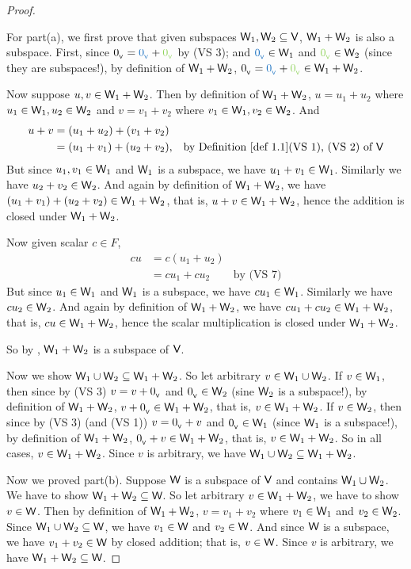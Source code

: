 \begin{proof}\ 

For part(a), we first prove that given subspaces \(\textsf{W}_1, \textsf{W}_2 \subseteq \textsf{V}\), \(\textsf{W}_1 + \textsf{W}_2\) is also a subspace.
First, since \(\OV = \BLUE{\OV} + \GREEN{\OV}\) by (VS 3);
and \(\BLUE{\OV} \in \W_1\) and \(\GREEN{\OV} \in \W_2\) (since they are subspaces!), by definition of \(\textsf{W}_1 + \textsf{W}_2\), \(\OV = \BLUE{\OV} + \GREEN{\OV} \in \W_1 + \W_2\).

Now suppose \(u, v \in \textsf{W}_1 + \textsf{W}_2\).
Then by definition of \(\textsf{W}_1 + \textsf{W}_2\), \(u = u_1 + u_2\) where \(u_1 \in \textsf{W}_1, u_2 \in \textsf{W}_2\) and \(v = v_1 + v_2\) where \(v_1 \in \textsf{W}_1, v_2 \in \textsf{W}_2\).
And
\begin{align*}
    u + v & = (u_1 + u_2) + (v_1 + v_2) \\
          & = (u_1 + v_1) + (u_2 + v_2), & \text{by \DEF{1.1}(VS 1), (VS 2) of \(\V\)}
\end{align*}
But since \(u_1, v_1 \in \textsf{W}_1\) and \(\textsf{W}_1\) is a subspace, we have \(u_1 + v_1 \in \textsf{W}_1\).
Similarly we have \(u_2 + v_2 \in \textsf{W}_2\).
And again by definition of \(\textsf{W}_1 + \textsf{W}_2\), we have \((u_1 + v_1) + (u_2 + v_2) \in \textsf{W}_1 + \textsf{W}_2\), that is, \(u + v \in \textsf{W}_1 + \textsf{W}_2\), hence the addition is closed under \(\textsf{W}_1 + \textsf{W}_2\).

Now given scalar \(c \in F\),
\begin{align*}
    c u & = c(u_1 + u_2) \\
        & = c u_1 + c u_2 & \text{by (VS 7)}
\end{align*}
But since \(u_1 \in \textsf{W}_1\) and \(\textsf{W}_1\) is a subspace, we have \(c u_1 \in \textsf{W}_1\).
Similarly we have \(c u_2 \in \textsf{W}_2\).
And again by definition of \(\textsf{W}_1 + \textsf{W}_2\), we have \(c u_1 + c u_2 \in \textsf{W}_1 + \textsf{W}_2\), that is, \(c u \in \textsf{W}_1 + \textsf{W}_2\), hence the scalar multiplication is closed under \(\textsf{W}_1 + \textsf{W}_2\).

So by , \(\textsf{W}_1 + \textsf{W}_2\) is a subspace of \(\textsf{V}\).

Now we show \(\textsf{W}_1 \cup \textsf{W}_2 \subseteq \textsf{W}_1 + \textsf{W}_2\).
So let arbitrary \(v \in \textsf{W}_1 \cup \textsf{W}_2\).
If \(v \in \textsf{W}_1\), then since by (VS 3) \(v = v + 0_{_{\textsf{V}}}\) and \(0_{_{\textsf{V}}} \in \textsf{W}_2\) (sine \(\textsf{W}_2\) is a subspace!), by definition of \(\textsf{W}_1 + \textsf{W}_2\), \(v + 0_{_{\textsf{V}}} \in \textsf{W}_1 + \textsf{W}_2\), that is, \(v \in \textsf{W}_1 + \textsf{W}_2\).
If \(v \in \textsf{W}_2\), then since by (VS 3) (and (VS 1)) \(v = 0_{_{\textsf{V}}} + v\) and \(0_{_{\textsf{V}}} \in \textsf{W}_1\) (since \(\textsf{W}_1\) is a subspace!), by definition of \(\textsf{W}_1 + \textsf{W}_2\), \(0_{_{\textsf{V}}} + v \in \textsf{W}_1 + \textsf{W}_2\), that is, \(v \in \textsf{W}_1 + \textsf{W}_2\).
So in all cases, \(v \in \textsf{W}_1 + \textsf{W}_2\).
Since \(v\) is arbitrary, we have \(\textsf{W}_1 \cup \textsf{W}_2 \subseteq \textsf{W}_1 + \textsf{W}_2\).

Now we proved part(b).
Suppose \(\textsf{W}\) is a subspace of \(\textsf{V}\) and contains \(\textsf{W}_1 \cup \textsf{W}_2\).
We have to show \(\textsf{W}_1 + \textsf{W}_2 \subseteq \textsf{W}\).
So let arbitrary \(v \in \textsf{W}_1 + \textsf{W}_2\), we have to show \(v \in \textsf{W}\).
Then by definition of \(\textsf{W}_1 + \textsf{W}_2\), \(v = v_1 + v_2\) where \(v_1 \in \textsf{W}_1\) and \(v_2 \in \textsf{W}_2\).
Since \(\textsf{W}_1 \cup \textsf{W}_2 \subseteq \textsf{W}\), we have \(v_1 \in \textsf{W}\) and \(v_2 \in \textsf{W}\).
And since \(\textsf{W}\) is a subspace, we have \(v_1 + v_2 \in \textsf{W}\) by closed addition;
that is, \(v \in \textsf{W}\).
Since \(v\) is arbitrary, we have \(\textsf{W}_1 + \textsf{W}_2 \subseteq \textsf{W}\).
\end{proof}


